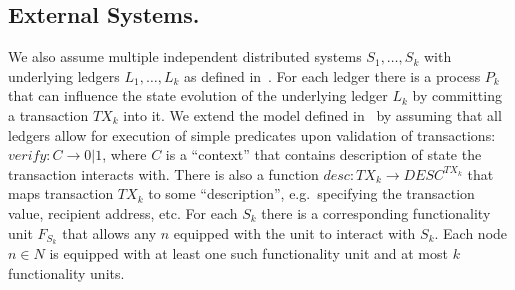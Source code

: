 \subsection{External Systems.}\label{subsec:external-systems.}
We also assume multiple independent distributed systems ${S_1, \dots, S_k}$ with underlying ledgers ${L_1, \dots, L_k}$ as defined in~\cite{cryptoeprint:2019/1128}.
For each ledger there is a process $P_k$ that can influence the state evolution of the underlying ledger $L_k$ by committing a transaction $TX_k$ into it.
We extend the model defined in~\cite{cryptoeprint:2019/1128} by assuming that all ledgers allow for execution of simple predicates upon validation of transactions:
${verify: C \rightarrow 0 | 1}$, where $C$ is a \enquote{context} that contains description of state the transaction interacts with.
There is also a function ${desc: TX_k \rightarrow DESC^{TX_k}}$ that maps transaction $TX_k$ to some \enquote{description}, e.g.\ specifying the transaction value, recipient address, etc.
For each  $S_k$ there is a corresponding functionality unit $F_{S_k}$ that allows any $n$ equipped with the unit to interact with $S_k$.
Each node $n \in N$ is equipped with at least one such functionality unit and at most $k$ functionality units.